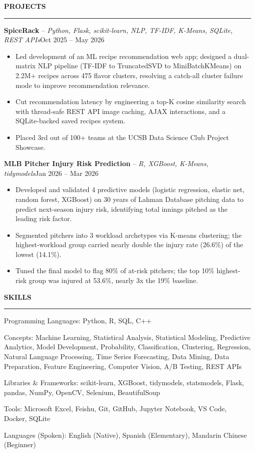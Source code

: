 \documentclass[letterpaper,10pt]{article}
\newcommand{\resumeSection}[1]{%
  \vspace{3pt}%
  {\large\bfseries #1}\par
  \vspace{-4pt}\rule{\linewidth}{0.4pt}\par
  \vspace{1pt}%
}
\newcommand{\projectEntry}[2]{%
  #1\hfill #2\par
}
\newenvironment{bullets}{\begin{itemize}}{\end{itemize}\vspace{1pt}}
\begin{document}
\resumeSection{PROJECTS}
\projectEntry{{\large\bfseries SpiceRack} -- \textit{Python, Flask, scikit-learn, NLP, TF-IDF, K-Means, SQLite, REST APIs}}{Oct 2025 -- May 2026}
\begin{bullets}
  \item Led development of an ML recipe recommendation web app; designed a dual-matrix NLP pipeline (TF-IDF to TruncatedSVD to MiniBatchKMeans) on 2.2M+ recipes across 475 flavor clusters, resolving a catch-all cluster failure mode to improve recommendation relevance.
  \item Cut recommendation latency by engineering a top-K cosine similarity search with thread-safe REST API image caching, AJAX interactions, and a SQLite-backed saved recipes system.
  \item Placed 3rd out of 100+ teams at the UCSB Data Science Club Project Showcase.
\end{bullets}
\projectEntry{{\large\bfseries MLB Pitcher Injury Risk Prediction} -- \textit{R, XGBoost, K-Means, tidymodels}}{Jan 2026 -- Mar 2026}
\begin{bullets}
  \item Developed and validated 4 predictive models (logistic regression, elastic net, random forest, XGBoost) on 30 years of Lahman Database pitching data to predict next-season injury risk, identifying total innings pitched as the leading risk factor.
  \item Segmented pitchers into 3 workload archetypes via K-means clustering; the highest-workload group carried nearly double the injury rate (26.6\%) of the lowest (14.1\%).
  \item Tuned the final model to flag 80\% of at-risk pitchers; the top 10\% highest-risk group was injured at 53.6\%, nearly 3x the 19\% baseline.
\end{bullets}

\resumeSection{SKILLS}
Programming Languages: Python, R, SQL, C++\par
Concepts: Machine Learning, Statistical Analysis, Statistical Modeling, Predictive Analytics, Model Development, Probability, Classification, Clustering, Regression, Natural Language Processing, Time Series Forecasting, Data Mining, Data Preparation, Feature Engineering, Computer Vision, A/B Testing, REST APIs\par
Libraries \& Frameworks: scikit-learn, XGBoost, tidymodels, statsmodels, Flask, pandas, NumPy, OpenCV, Selenium, BeautifulSoup\par
Tools: Microsoft Excel, Feishu, Git, GitHub, Jupyter Notebook, VS Code, Docker, SQLite\par
Languages (Spoken): English (Native), Spanish (Elementary), Mandarin Chinese (Beginner)\par
\end{document}
